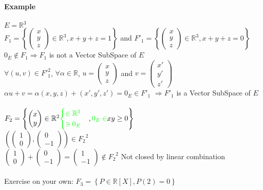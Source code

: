 \documentclass[notitlepage]{math}
\begin{document}
\paragraph{Example}
\noindent $E = \mathbb{R}^3$\\
$F_1 = \left\{\begin{pmatrix} x\\ y\\ z \end{pmatrix} \in \mathbb{R}^3, x + y + z = 1\right\}$ and $F'_1 = \left\{\begin{pmatrix} x\\ y\\ z \end{pmatrix} \in \mathbb{R}^3, x + y + z = 0\right\}$\\
$0_E \notin F_1 \Longrightarrow F_1$ is not a Vector SubSpace of $E$\\
$\forall (u, v) \in {F'}_1^2$, $\forall \alpha \in \mathbb{R}$, $u = \begin{pmatrix} x\\ y\\ z \end{pmatrix}$ and $v = \begin{pmatrix} x'\\ y'\\ z' \end{pmatrix}$\\
$\alpha u + v = \alpha(x, y, z) + (x', y', z') = 0_E \in F'_1$
$\Longrightarrow F'_1$ is a Vector SubSpace of $E$\\
\\
\noindent
$F_2 = \left\{\begin{pmatrix} x\\ y \end{pmatrix} \in \mathbb{R}^2 {\color{green} \begin{cases} \in \mathbb{R}^3 \\ \ni 0_E \end{cases}},{\color{green}0_E \in } x y \ge 0\right\}$ \\
$\left( \begin{pmatrix}
    1 \\ 0 \end{pmatrix} , \begin{pmatrix}
    0 \\ -1 \end{pmatrix}\right) \in {F_2}^2$ \\
$\begin{pmatrix}
1 \\ 0 \end{pmatrix} + \begin{pmatrix}
0 \\ -1 \end{pmatrix} = \begin{pmatrix} 1 \\ -1 \end{pmatrix} \notin {F_2}^2$ Not closed by linear combination \\
\\
Exercise on your own: 
$F_3 = \left\{P \in \mathbb{R}[X], P(2) = 0 \right\}$
\end{document}
